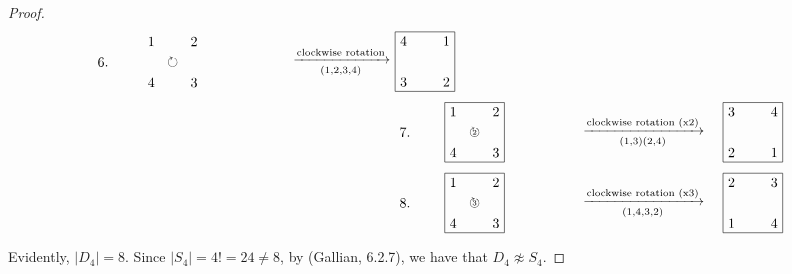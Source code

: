 \documentclass[12pt,reqno]{article}
\theoremstyle{plain}
\theoremstyle{definition}
\begin{document}
\begin{proof}
\begin{align*}
\begin{tikzpicture}
            \node at (-1, 0.75) {6.};
            \node[below right] at (0,1.5) {1};
            \node[below left] at (1.5,1.5) {2};
            \node[above left] at (1.5,0) {3};
            \node[above right] at (0,0) {4};
            \node at (0.75,0.75) {\(\circlearrowright\)};
            \node at (5,0.75) {\(\xrightarrow[(1,2,3,4)]{\text{clockwise rotation}}\)};
        \end{tikzpicture}
        &\begin{tikzpicture}
            \draw (0,0) -- (0,1.5) -- (1.5,1.5) -- (1.5,0) -- (0,0);
            \node[below right] at (0,1.5) {4};
            \node[below left] at (1.5,1.5) {1};
            \node[above left] at (1.5,0) {2};
            \node[above right] at (0,0) {3};
        \end{tikzpicture}
        \\
        &\begin{tikzpicture}
            \draw (0,0) -- (0,1.5) -- (1.5,1.5) -- (1.5,0) -- (0,0);
            \node at (-1, 0.75) {7.};
            \node[below right] at (0,1.5) {1};
            \node[below left] at (1.5,1.5) {2};
            \node[above left] at (1.5,0) {3};
            \node[above right] at (0,0) {4};
            \node at (0.75,0.75) {\(\circlearrowright\)};
            \node at (0.75,0.75) {\tiny{2}};
            \node at (5,0.75) {\(\xrightarrow[(1,3)(2,4)]{\text{clockwise rotation (x2)}}\)};
        \end{tikzpicture}
        &\begin{tikzpicture}
            \draw (0,0) -- (0,1.5) -- (1.5,1.5) -- (1.5,0) -- (0,0);
            \node[below right] at (0,1.5) {3};
            \node[below left] at (1.5,1.5) {4};
            \node[above left] at (1.5,0) {1};
            \node[above right] at (0,0) {2};
        \end{tikzpicture}
        \\
        &\begin{tikzpicture}
            \draw (0,0) -- (0,1.5) -- (1.5,1.5) -- (1.5,0) -- (0,0);
            \node at (-1, 0.75) {8.};
            \node[below right] at (0,1.5) {1};
            \node[below left] at (1.5,1.5) {2};
            \node[above left] at (1.5,0) {3};
            \node[above right] at (0,0) {4};
            \node at (0.75,0.75) {\(\circlearrowright\)};
            \node at (0.75,0.75) {\tiny{3}};
            \node at (5,0.75) {\(\xrightarrow[(1,4,3,2)]{\text{clockwise rotation (x3)}}\)};
        \end{tikzpicture}
        &\begin{tikzpicture}
            \draw (0,0) -- (0,1.5) -- (1.5,1.5) -- (1.5,0) -- (0,0);
            \node[below right] at (0,1.5) {2};
            \node[below left] at (1.5,1.5) {3};
            \node[above left] at (1.5,0) {4};
            \node[above right] at (0,0) {1};
        \end{tikzpicture}
    \end{align*}
    Evidently, \(|D_4|=8\). Since \(|S_4|=4!=24\neq 8\), by (Gallian, 6.2.7), we have that \(D_4\not\approx S_4\).
\end{proof}
\end{document}
